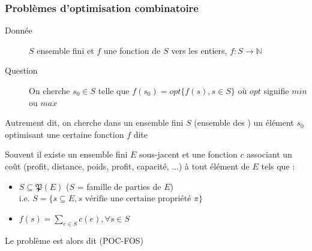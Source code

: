 \documentclass[aspectratio=1610,francais,envcountsect]{beamer}
\begin{document}
\begin{frame}[allowframebreaks]
  \frametitle{Problèmes d'optimisation combinatoire}

  \begin{definition}[POC]%
    \begin{description}
    \item[Donnée] $S$ ensemble fini et $f$ une fonction de $S$ vers
      les entiers, $f : S \to \mathbb{N}$
    \item[Question] On cherche $s_0 \in S$ telle que
      $f(s_0) = opt \{ f(s), s\in S\}$ où $opt$ signifie $min$ ou
      $max$
    \end{description}
  \end{definition}

  Autrement dit, on cherche dans un ensemble fini $S$ (ensemble des
  ) un élément $s_0$
  optimisant une certaine fonction $f$ dite 

  \framebreak

  Souvent il existe un ensemble fini $E$ sous-jacent et une fonction
  $c$ associant un coût (profit, distance, poids, profit, capacité,
  ...) à tout élément de $E$ tels que :

  \begin{itemize}
  \item $S \subseteq \mathfrak{P}(E)$ ($S$ = famille de parties de
    $E$)\\ i.e.
    $S = \{ s \subseteq E, s \text{ vérifie une certaine propriété }
    \pi \}$
  \item $f(s)= \sum_{e\in S} c(e), \forall s \in S$
  \end{itemize}

  Le problème est alors dit  (POC-FOS)
  
\end{frame}
\end{document}
